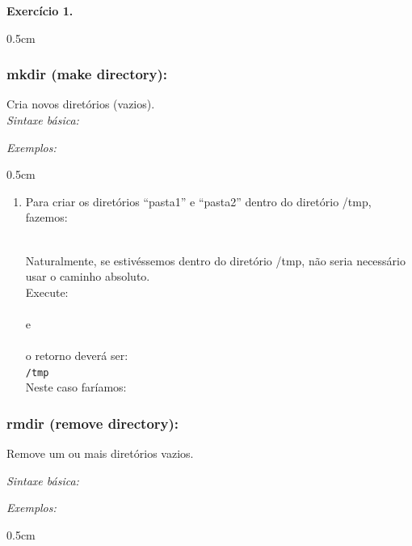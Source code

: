 \begin{refsection}
\begin{blackBlock}{\textbf{Exercício 1.}}
\begin {myindentpar}{0.5cm}
\begin{enumerate}[\itshape i.]
\end{enumerate}
\end{myindentpar}

\end{blackBlock}

\subsubsection{mkdir (make directory):}\label{tut1:text_mode:commands:mkdir}


 Cria novos diretórios (vazios).\\

 \textit{Sintaxe básica:}


\textit{Exemplos:}
 \begin {myindentpar}{0.5cm}
 \begin{enumerate}[\itshape i.]
 \item{Para criar os diretórios ``pasta1'' e ``pasta2'' dentro do diretório /tmp, fazemos:}

 \\
Naturalmente, se estivéssemos dentro do diretório /tmp, não seria necessário usar o caminho absoluto.\\
Execute:\\
 \\
e\\
 \\
o retorno deverá ser:\\
 \texttt{/tmp}\\
Neste caso faríamos:\\
\end{enumerate}
\end{myindentpar}

\subsubsection{rmdir (remove directory):}\label{tut1:text_mode:commands:rmdir}

 Remove um ou mais diretórios vazios.

 \textit{Sintaxe básica:}


\textit{Exemplos:}
\begin {myindentpar}{0.5cm}
\begin{enumerate}[\itshape i.]


\end{enumerate}
\end{myindentpar}
\end{refsection}
